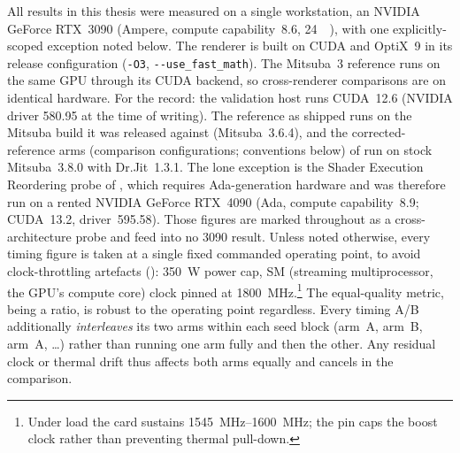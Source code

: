 All results in this thesis were measured on a single workstation, an NVIDIA GeForce RTX~3090 (Ampere,
compute capability~8.6, \SI{24}{\giga\byte}), with one explicitly-scoped exception noted below. The
renderer is built on CUDA and OptiX~9 in its release configuration (\texttt{-O3},
\texttt{-{}-use\_fast\_math}). The Mitsuba~3 reference runs on the same GPU through its CUDA backend, so
cross-renderer comparisons are on identical hardware. For the record: the validation host runs
CUDA~12.6 (NVIDIA driver 580.95 at the time of writing). The reference as shipped runs on the
Mitsuba build it was released against (Mitsuba~3.6.4), and the corrected-reference arms
(comparison configurations; conventions below) of
 run on stock Mitsuba~3.8.0 with Dr.Jit~1.3.1. The lone exception is the Shader Execution
Reordering probe of , which requires Ada-generation hardware and was therefore run on a
rented NVIDIA GeForce RTX~4090 (Ada, compute capability~8.9; CUDA~13.2, driver~595.58). Those figures are
marked throughout as a cross-architecture probe and feed into no 3090 result. Unless noted
otherwise, every timing figure is taken at a single fixed commanded operating point, to avoid
clock-throttling artefacts (): \SI{350}{\watt} power
cap, SM (streaming multiprocessor, the GPU's compute core) clock pinned at
\SI{1800}{\mega\hertz}.\footnote{Under load the card sustains
\SIrange{1545}{1600}{\mega\hertz}; the pin caps the boost clock rather than preventing thermal pull-down.} The
equal-quality metric,
being a ratio, is robust to the operating point regardless. Every timing A/B additionally
\emph{interleaves} its two arms within each seed block (arm~A, arm~B, arm~A, \ldots) rather than running
one arm fully and then the other. Any residual clock or thermal drift thus affects both arms equally
and cancels in the comparison.


